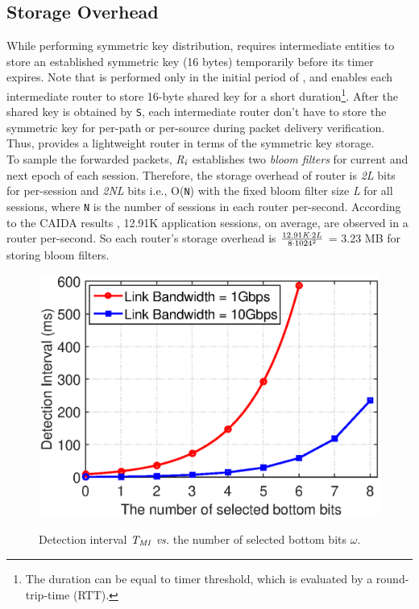 \subsection{Storage Overhead}
\label{storageoverhead}
While performing symmetric key distribution, \namekey{} requires intermediate entities to store an established symmetric key (16 bytes) temporarily before its timer expires. Note that \namekey{} is performed only in the initial period of \name{}, and enables each intermediate router to store 16-byte shared key for a short duration\footnote{The duration can be equal to timer threshold, which is evaluated by a round-trip-time (RTT).}. After the shared key is obtained by {\tt S}, each intermediate router don't have to store the symmetric key for per-path or per-source during packet delivery verification. Thus, \name{} provides a lightweight router in terms of the symmetric key storage.\\
\indent 
To sample the forwarded packets, \emph{R}$_\emph{i}$ establishes two \emph{bloom filters} for current and next epoch of each session. Therefore, the storage overhead of router is \emph{2L} bits for per-session and \emph{2NL} bits i.e., O({\tt N}) with the fixed bloom filter size \emph{L} for all sessions, where {\tt N} is the number of sessions in each router per-second. According to the CAIDA results \cite{portionlargepkt}, 12.91K application sessions, on average, are observed in a router per-second. So each router's storage overhead is $\frac{12.91\emph{K}\cdot 2L}{8\cdot1024^2}$ = 3.23 MB for storing bloom filters. 
\begin{figure}%
  \centering
  \includegraphics[width=0.65\columnwidth]{code_matlab/tmi2.eps}\\
  \caption{Detection interval $\emph{T}_{\emph{MI}}$ \emph{vs.} the number of selected bottom bits $\omega$.}\label{tmifig}
\end{figure}

